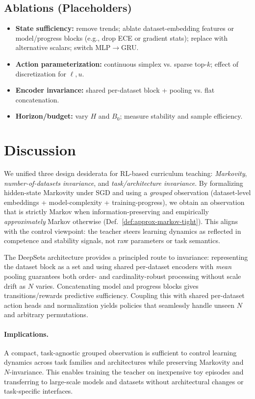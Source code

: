 \documentclass[11pt]{article}
\newcommand{\1}{\mathbf{1}}
\begin{document}
\subsection{Ablations (Placeholders)}
\begin{itemize}[leftmargin=1.5em]
\item \textbf{State sufficiency:} remove trends; ablate dataset-embedding features or model/progress blocks (e.g., drop ECE or gradient stats); replace with alternative scalars; switch MLP$\to$GRU.
\item \textbf{Action parameterization:} continuous simplex vs. sparse top-$k$; effect of discretization for $\ell,u$.
\item \textbf{Encoder invariance:} shared per-dataset block + pooling vs. flat concatenation.
\item \textbf{Horizon/budget:} vary $H$ and $B_0$; measure stability and sample efficiency.
\end{itemize}

\section{Discussion}
We unified three design desiderata for RL-based curriculum teaching: \emph{Markovity}, \emph{number-of-datasets invariance}, and \emph{task/architecture invariance}.
By formalizing hidden-state Markovity under SGD and using a \emph{grouped} observation (dataset-level embeddings + model-complexity + training-progress), we obtain an observation that is strictly Markov when information-preserving and empirically \emph{approximately} Markov otherwise (Def.~\ref{def:approx-markov-tight}).
This aligns with the control viewpoint: the teacher steers learning dynamics as reflected in competence and stability signals, not raw parameters or task semantics.

The DeepSets architecture provides a principled route to invariance: representing the dataset block as a set and using shared per-dataset encoders with \emph{mean} pooling guarantees both order- and cardinality-robust processing without scale drift as $N$ varies. Concatenating model and progress blocks gives transitions/rewards predictive sufficiency. Coupling this with shared per-dataset action heads and normalization yields policies that seamlessly handle unseen $N$ and arbitrary permutations.

\paragraph{Implications.}
A compact, task-agnostic grouped observation is sufficient to control learning dynamics across task families and architectures while preserving Markovity and $N$-invariance.
This enables training the teacher on inexpensive toy episodes and transferring to large-scale models and datasets without architectural changes or task-specific interfaces.
\end{document}
